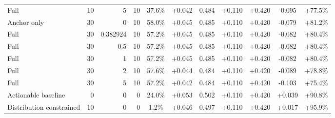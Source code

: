 \begin{table}[htbp]
\begin{tabular}{lrrrccccccc}
Full & 10 & 5 & 10 & 37.6\% & +0.042 & 0.484 & +0.110 & +0.420 & -0.095 & +77.5\% \\
Anchor only & 30 & 0 & 10 & 58.0\% & +0.045 & 0.485 & +0.110 & +0.420 & -0.079 & +81.2\% \\
Full & 30 & 0.382924 & 10 & 57.2\% & +0.045 & 0.485 & +0.110 & +0.420 & -0.082 & +80.4\% \\
Full & 30 & 0.5 & 10 & 57.2\% & +0.045 & 0.485 & +0.110 & +0.420 & -0.082 & +80.4\% \\
Full & 30 & 1 & 10 & 57.2\% & +0.045 & 0.485 & +0.110 & +0.420 & -0.082 & +80.4\% \\
Full & 30 & 2 & 10 & 57.6\% & +0.044 & 0.484 & +0.110 & +0.420 & -0.089 & +78.8\% \\
Full & 30 & 5 & 10 & 57.2\% & +0.042 & 0.484 & +0.110 & +0.420 & -0.103 & +75.4\% \\
Actionable baseline & 0 & 0 & 0 & 24.0\% & +0.053 & 0.502 & +0.110 & +0.420 & +0.039 & +90.8\% \\
Distribution constrained & 10 & 0 & 0 & 1.2\% & +0.046 & 0.497 & +0.110 & +0.420 & +0.017 & +95.9\% \\
\bottomrule
\end{tabular}
\end{table}